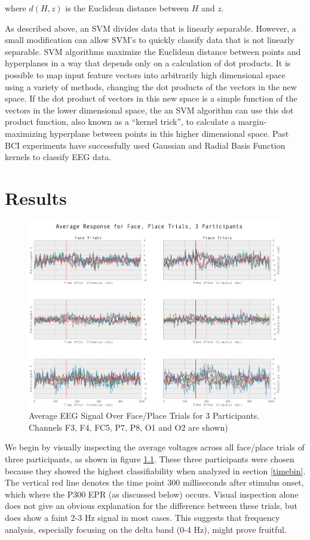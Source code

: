 \documentclass[12pt]{report}
\begin{document}
		where $d(H,z)$ is the Euclidean distance between $H$ and $z$.
		
	As described above, an SVM divides data that is linearly separable.  However, a small modification can allow SVM's to quickly classify data that is not linearly separable.  SVM algorithms maximize the Euclidean distance between points and hyperplanes in a way that depends only on a calculation of dot products.  It is possible to map input feature vectors into arbitrarily high dimensional space using a variety of methods, changing the dot products of the vectors in the new space.  If the dot product of vectors in this new space is a simple function of the vectors in the lower dimensional space, the an SVM algorithm can use this dot product function, also known as a ``kernel trick'', to calculate a margin-maximizing hyperplane between points in this higher dimensional space.  Past BCI experiments have successfully used Gaussian and 	Radial Basis Function kernels to classify EEG data\cite{Lotte}.



\chapter{Results}

\begin{figure}[t]
\centerline{
\includegraphics[width=6in]{3partsfaceplace}
}
\caption{Average EEG Signal Over Face/Place Trials for 3 Participants.  Channels F3, F4, FC5, P7, P8, O1 and O2 are shown) \label{3partsfaceplace}}
\end{figure}

	We begin by visually inspecting the average voltages across all face/place trials of three participants, as shown in figure \ref{3partsfaceplace}.  These three participants were chosen because they showed the highest classifiability when analyzed in section \ref{timebin}.  The vertical red line denotes the time point 300 milliseconds after stimulus onset, which where the P300 EPR (as discussed below) occurs.  Visual inspection alone does not give an obvious explanation for the difference between these trials, but does show a faint 2-3 Hz signal in most cases.  This suggests that frequency analysis, especially focusing on the delta band (0-4 Hz), might prove fruitful.
\end{document}
